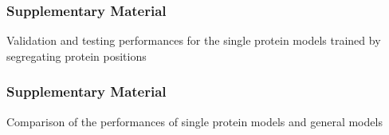 \documentclass[10pt, british, luatex]{beamer}
\begin{document}
\begin{frame}
	\frametitle{Supplementary Material}
	Validation and testing performances for the single protein models trained by segregating protein positions\\[1ex]
	{%
	\centering%
	\let\bfseries\sbseries%
	
	}
\end{frame}

\begin{frame}
	\frametitle{Supplementary Material}
	Comparison of the performances of single protein models and general models\\[1ex]
	\vspace{\baselineskip}%
	{%
		\centering%
		\let\bfseries\sbseries%
		
	}
\end{frame}
\end{document}
